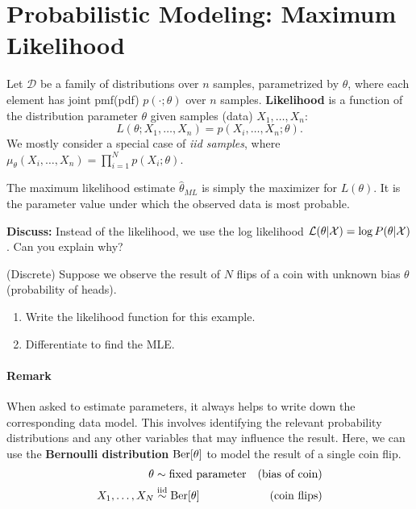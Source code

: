 \documentclass{discussion}
\begin{document}
\section{Probabilistic Modeling: Maximum Likelihood}

Let $\mathcal{D}$ be a family of distributions over $n$ samples, parametrized by $\theta$, where each element has joint pmf(pdf) $p(\cdot;\theta)$ over $n$ samples. \textbf{Likelihood} is a function of the distribution parameter $\theta$ given samples (data) $X_1, \ldots, X_n$:
\[L(\theta; X_1, \ldots, X_n) = p(X_i, \ldots, X_n; \theta).\]
We mostly consider a special case of \emph{iid samples}, where $\mu_\theta(X_i, \ldots, X_n) = \prod_{i=1}^{N} p(X_i;\theta).$

The maximum likelihood estimate $\hat{\theta}_{ML}$ is simply the maximizer for $L(\theta)$. It is the parameter value under which the observed data is most probable.




\textbf{Discuss:} Instead of the likelihood, we use the log likelihood $\mathcal{L}(\theta|\mathcal{X}) = \log P(\theta|\mathcal{X})$. Can you explain why?

\vspace{1em}

\begin{exercise}(Discrete)
Suppose we observe the result of $N$ flips of a coin with unknown bias $\theta$ (probability of heads).
\begin{enumerate}
\item Write the likelihood function for this example.
\item Differentiate to find the MLE. 
\end{enumerate}
\end{exercise}

\paragraph{Remark}When asked to estimate parameters, it always helps to write down the corresponding data model.  This involves identifying the relevant probability distributions and any other variables that may influence the result.  Here, we can use the \textbf{Bernoulli distribution} $\text{Ber}[\theta]$ to model the result of a single coin flip.
    \begin{align*}
    \theta &\sim \text{fixed parameter} & \text{(bias of coin)} \\
    X_1, \dots, X_N &\stackrel{\text{iid}}{\sim} \text{Ber}[\theta] & \text{(coin flips)}
    \end{align*}
\end{document}
